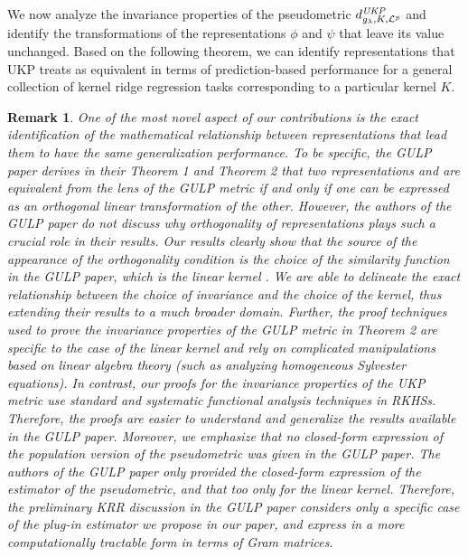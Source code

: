 \documentclass{article} %
\newcommand{\repone}{\phi}
\newcommand{\reptwo}{\psi}
\newcommand{\gl}{g_{\lambda}}
\newcommand{\metricstname}{UKP }
\newcommand{\dLpgl}{d_{\gl,K,\mathcal{L}^{p}}^{\emph{\metricstname}}}
\theoremstyle{plain}
\newcounter{remarkno}
\newtheorem{remark}[remarkno]{Remark}
\begin{document}
We now analyze the invariance properties of the pseudometric $\dLpgl$ and identify the transformations of the representations $\repone$ and $\reptwo$ that leave its value unchanged. Based on the following theorem, we can identify representations that \metricstname treats as equivalent in terms of prediction-based performance for a general collection of kernel ridge regression tasks corresponding to a particular kernel $K$.
\begin{remark}
One of the most novel aspect of our contributions is the exact identification of the mathematical relationship between representations that lead them to have the same generalization performance. To be specific, the GULP paper derives in their Theorem 1 and Theorem 2 that two representations  and  are equivalent from the lens of the GULP metric if and only if one can be expressed as an orthogonal linear transformation of the other. However, the authors of the GULP paper do not discuss why orthogonality of representations plays such a crucial role in their results. Our results clearly show that the source of the appearance of the orthogonality condition is the choice of the similarity function in the GULP paper, which is the linear kernel . We are able to delineate the exact relationship between the choice of invariance and the choice of the kernel, thus extending their results to a much broader domain. Further, the proof techniques used to prove the invariance properties of the GULP metric in Theorem 2 are specific to the case of the linear kernel and rely on complicated manipulations based on linear algebra theory (such as analyzing homogeneous Sylvester equations). In contrast, our proofs for the invariance properties of the UKP metric use standard and systematic functional analysis techniques in RKHSs. Therefore, the proofs are easier to understand and generalize the results available in the GULP paper. Moreover, we emphasize that no closed-form expression of the population version of the pseudometric was given in the GULP paper. The authors of the GULP paper only provided the closed-form expression of the estimator of the pseudometric, and that too only for the linear kernel. Therefore, the preliminary KRR discussion in the GULP paper considers only a specific case of the plug-in estimator we propose in our paper, and express in a more computationally tractable form in terms of Gram matrices.
\end{remark}
\end{document}
